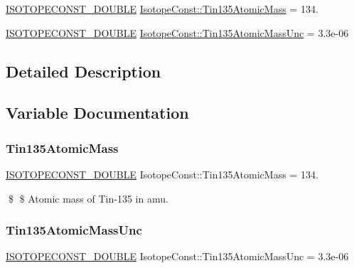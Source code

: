 \begin{DoxyCompactItemize}
\item 
\mbox{\hyperlink{group___isotope_const-_macros_ga8f45a7272ce02c0b4c65c44636ed719a}{I\+S\+O\+T\+O\+P\+E\+C\+O\+N\+S\+T\+\_\+\+D\+O\+U\+B\+LE}} \mbox{\hyperlink{group___isotope_const-_tin-_sn135_gad4f916a1974b4666a347a6308260fa6e}{Isotope\+Const\+::\+Tin135\+Atomic\+Mass}} = 134.
\item 
\mbox{\hyperlink{group___isotope_const-_macros_ga8f45a7272ce02c0b4c65c44636ed719a}{I\+S\+O\+T\+O\+P\+E\+C\+O\+N\+S\+T\+\_\+\+D\+O\+U\+B\+LE}} \mbox{\hyperlink{group___isotope_const-_tin-_sn135_gaee74a93850a09ee7c9587b44d894fbea}{Isotope\+Const\+::\+Tin135\+Atomic\+Mass\+Unc}} = 3.\+3e-\/06
\end{DoxyCompactItemize}


\subsection{Detailed Description}


\subsection{Variable Documentation}
\mbox{\label{group___isotope_const-_tin-_sn135_gad4f916a1974b4666a347a6308260fa6e}} 
\subsubsection{\texorpdfstring{Tin135\+Atomic\+Mass}{Tin135AtomicMass}}
{\footnotesize\ttfamily \mbox{\hyperlink{group___isotope_const-_macros_ga8f45a7272ce02c0b4c65c44636ed719a}{I\+S\+O\+T\+O\+P\+E\+C\+O\+N\+S\+T\+\_\+\+D\+O\+U\+B\+LE}} Isotope\+Const\+::\+Tin135\+Atomic\+Mass = 134.}

\$ \$ Atomic mass of Tin-\/135 in amu. \mbox{\label{group___isotope_const-_tin-_sn135_gaee74a93850a09ee7c9587b44d894fbea}} 
\subsubsection{\texorpdfstring{Tin135\+Atomic\+Mass\+Unc}{Tin135AtomicMassUnc}}
{\footnotesize\ttfamily \mbox{\hyperlink{group___isotope_const-_macros_ga8f45a7272ce02c0b4c65c44636ed719a}{I\+S\+O\+T\+O\+P\+E\+C\+O\+N\+S\+T\+\_\+\+D\+O\+U\+B\+LE}} Isotope\+Const\+::\+Tin135\+Atomic\+Mass\+Unc = 3.\+3e-\/06}

